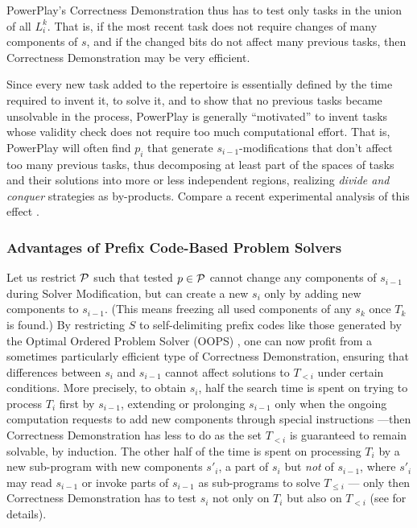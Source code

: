 \documentclass{article}
\begin{document}
{\sc PowerPlay}'s {\sc Correctness Demonstration} thus has to test only tasks in the union of all $L^k_i$.
That is, if the most recent task does not require changes of many components of $s$, and 
if the changed bits do not affect many previous tasks, then  {\sc Correctness Demonstration}
may be very efficient.

Since every new task added to the repertoire is essentially defined by the time required 
to invent it, to solve it, and to show that no previous tasks became unsolvable in the process,
{\sc PowerPlay} is generally ``motivated'' to invent tasks whose validity check does not require too much
computational effort. That is, {\sc PowerPlay} will often find $p_i$ that generate $s_{i-1}$-modifications that don't
affect too many previous tasks, thus decomposing at least part of the spaces of tasks and their solutions  into more or
less independent regions, realizing {\em divide and conquer} strategies as by-products. Compare a recent experimental
analysis of this effect \cite{rupesh2012icdl,powerplay2012experiments}.

\subsubsection{Advantages of Prefix Code-Based Problem Solvers}
\label{prefix}

Let us restrict $\cal P$ such that tested $p \in \cal P$ cannot change any components of $s_{i-1}$ during {\sc Solver Modification},
but can create a new $s_i$ only by adding new components to $s_{i-1}$. (This means freezing all used components 
of any $s_k$ once $T_k$ is found.)
By restricting $S$ to self-delimiting prefix codes like those  generated by
the Optimal Ordered Problem Solver (OOPS) \cite{Schmidhuber:04oops}, 
one can now profit from a sometimes 
particularly efficient type of {\sc Correctness Demonstration},
ensuring that  differences between $s_i$ and $s_{i-1}$ cannot affect solutions to $T_{< i}$ under
certain conditions.
More precisely, to obtain $s_i$, half the search time is spent on trying to process $T_i$ first by $s_{i-1}$, 
extending or prolonging $s_{i-1}$
only when the ongoing computation requests to add new components 
through special instructions \cite{Schmidhuber:04oops}---then {\sc Correctness Demonstration}
has less to do as the set $T_{< i}$ is guaranteed to remain solvable, by induction. The other half of the time is spent 
on processing $T_i$ by a new sub-program with new components $s'_i$, a part of $s_i$ but {\em not} of $s_{i-1}$, 
where  $s'_i$ may read $s_{i-1}$ or invoke parts of $s_{i-1}$ as sub-programs to solve $T_{\leq i}$ --- only then {\sc Correctness Demonstration} has to test $s_i$ not only on $T_i$ but also on  $T_{< i}$ (see
\cite{Schmidhuber:04oops} for details).
\end{document}
